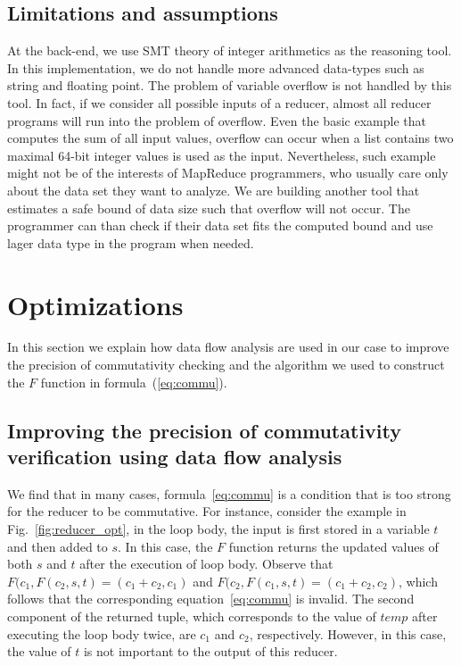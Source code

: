 \documentclass{llncs}
\begin{document}
\subsection{Limitations and assumptions}
At the back-end, we use SMT theory of integer arithmetics as the reasoning tool. In this implementation, we do not handle more advanced data-types such as string and floating point. 
The problem of variable overflow is not handled by this tool. In fact, if we consider all possible inputs of a reducer, almost all reducer programs will run into the problem of overflow. Even the basic example that computes the sum of all input values, overflow can occur when a list contains two maximal 64-bit integer values is used as the input. Nevertheless, such example might not be of the interests of MapReduce programmers, who usually care only about the data set they want to analyze. We are building another tool that estimates a safe bound of data size such that overflow will not occur. The programmer can than check if their data set fits the computed bound and use lager data type in the program when needed.

\section{Optimizations}
\label{section:optimizations}
In this section we explain how data flow analysis are used in our case to improve the precision of commutativity checking and the algorithm we used to construct the $F$ function in formula~(\ref{eq:commu}).

\subsection{Improving the precision of commutativity verification using data flow analysis}

We find that in many cases, formula~\ref{eq:commu} is a condition that is too strong for the reducer to be commutative. For instance, consider the example in Fig.~\ref{fig:reducer_opt}, in the loop body, the input is first stored in a variable $t$ and then added to $s$. In this case, the $F$ function returns the updated values of both $s$ and $t$ after the execution of loop body. Observe that 
$F(c_1, F(c_2,s,t) = (c_1+c_2, c_1)$ and $F(c_2, F(c_1,s,t) = (c_1+c_2, c_2)$, which follows that the corresponding equation~\ref{eq:commu} is invalid. The second component of the returned tuple, which corresponds to the value of $temp$ after executing the loop body twice, are $c_1$ and $c_2$, respectively. However, in this case, the value of $t$ is not important to the output of this reducer.
\end{document}
